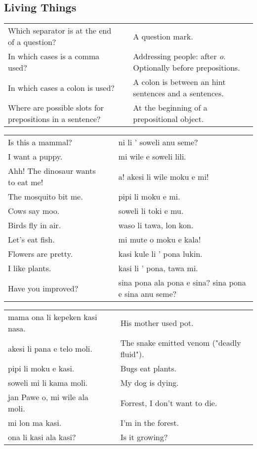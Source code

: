 \newpage
%
\subsection*{Living Things} 
\label{'living_things'}
%
\begin{supertabular}{p{5,5cm}|ll}
Which separator is at the end of a question? && A question mark.  \\ %
In which cases is a comma used? && Addressing people: after \textit{o}. Optionally before prepositions. \\ %
In which cases a colon is used? && A colon is between an hint sentences and a sentences. \\ %
Where are possible slots for prepositions in a sentence? && At the beginning of a prepositional object. \\ %
\end{supertabular}

\begin{supertabular}{p{5,5cm}|ll}
Is this a mammal? && ni li ' soweli anu seme?  \\ %
I want a puppy.  && mi wile e soweli lili. \\ %
Ahh! The dinosaur wants to eat me!  && a! akesi li wile moku e mi! \\ %
The mosquito bit me.  && pipi li moku e mi.  \\ %
Cows say moo.  && soweli li toki e mu. \\ %
Birds fly in air.  && waso li tawa, lon kon. \\ %
Let's eat fish.  && mi mute o moku e kala! \\ %
Flowers are pretty.  && kasi kule li ' pona lukin. \\ %
I like plants.  && kasi li ' pona, tawa mi. \\ %
Have you improved? && sina pona ala pona e sina? sina pona e sina anu seme? \\ %
\end{supertabular}  

\begin{supertabular}{p{5,5cm}|ll}
mama ona li kepeken kasi nasa.  && His mother used pot. \\
akesi li pana e telo moli.  && The snake emitted venom ("deadly fluid"). \\
pipi li moku e kasi.  && Bugs eat plants. \\
soweli mi li kama moli.  && My dog is dying. \\
jan Pawe o, mi wile ala moli.  && Forrest, I don't want to die. \\
mi lon ma kasi.  && I'm in the forest. \\
ona li kasi ala kasi? && Is it growing?  \\
\end{supertabular} 

